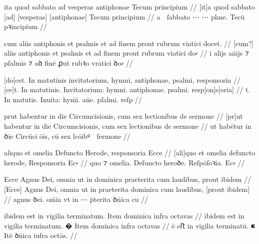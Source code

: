 \ex \bg
\gla
{}
ita quod sabbato ad vesperas antiphonae Tecum principium
//
\glRekonstrukcja
{}
[it]a quod sabbato [ad] [vesperas] [antiphonae] Tecum principium
//
\glU
{}
a  ſabbato ⋯ ⋯ phne. Tecū pꝛincipium
//
\endgl
\eg



\ex \bg
\gla
{}
cum aliis antiphonis et psalmis et ad finem prout rubrum viatici docet. 
//
\glRekonstrukcja
{}
[cum?] aliis antiphonis et psalmis et ad finem prout rubrum viatici do⸗ 
//
\glU
{}
i alijs an̄ijs ⁊ pſalmis ⁊ aꝺ finē ꝓut rubꝛo vratici ꝺo⸗ 
//
\endgl
\eg



\ex \bg
\gla
{}
[do]cet. In matutinis invitatorium, hymni, antiphonae, psalmi, responsoria
//
\glRekonstrukcja
{}
[ce]t. In matutinis. Invitatorium: hymni. antiphonae. psalmi. resp[on]s[oria] 
//
\glU
{}
t. In matutīs. Inuita: hym̄i. an̄e. pſalmi. reſp
//
\endgl
\eg



\ex \bg
\gla
{}
prut habentur in die Circumcisionis, cum sex lectionibus de sermone
//
\glRekonstrukcja
{}
[pr]ut habentur in die Circumcisionis, cum sex lectionibus de sermone
//
\glU
{}
ut habētur in ꝺie Circūciōis, cū sex lcōibꝰ  ſermone
//
\endgl
\eg

\ex \bg
\gla
{}
aliquo et
omelia Defuncto Herode, responsoria Ecce
//
\glRekonstrukcja
{}
[ali]quo et
omelia defuncto herode, Responsoria Ec⸗
//
\glU
{}
quo ⁊ omelia. Defuncto heroꝺe. Reſpōſoꝛia. Ec⸗
//
\endgl
\eg




\ex \bg
\gla
{}
Ecce Agnus Dei, omnia ut in dominica praeterita {} cum laudibus, prout ibidem
//
\glRekonstrukcja
{}
[Ecce] Agnus Dei, omnia ut in {} praeterita dominica cum laudibus, [prout ibidem]
//
\glU
{}
 agnus ꝺei. om̄ia vt in ⋯ p̄terita ꝺn̄ica cu   
//
\endgl
\eg



\ex \bg
\gla
{}
ibidem est in vigilia terminatum.
{} Item dominica infra octavas
//
\glRekonstrukcja
{}
ibidem est in vigilia terminatum.
� Item dominica infra octavas
//
\glU
{}
ē eﬅ in vigilia terminatū. ⁌ Itē ꝺn̄ica iufra octās.
//
\endgl
\eg



